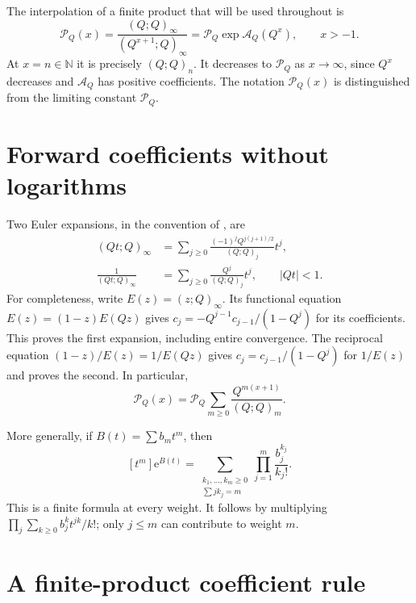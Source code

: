 \documentclass[11pt,openany]{book}
\numberwithin{equation}{chapter}
\theoremstyle{plain}
\theoremstyle{definition}
\theoremstyle{remark}
\newcommand{\ee}{\mathrm e}
\newcommand{\N}{\mathbb N}\newcommand{\R}{\mathbb R}\newcommand{\C}{\mathbb C}\newcommand{\Z}{\mathbb Z}
\newcommand{\coefB}[2]{[#1^{#2}]}             %
\newcommand{\pp}[1]{(Q;Q)_{#1}}
\newcommand{\Pinf}{\mathcal P_Q}
\newcommand{\A}{\mathcal A_Q}
\begin{document}
The interpolation of a finite product that will be used throughout is
\begin{equation}\label{t3:eq:product-interpolation}
 \mathcal P_Q(x)=\frac{(Q;Q)_\infty}{(Q^{x+1};Q)_\infty}
 =\Pinf\exp\A(Q^x),\qquad x>-1.
\end{equation}
At $x=n\in\N$ it is precisely $\pp{n}$. It decreases to $\Pinf$ as $x\to\infty$, since $Q^x$ decreases and $\A$ has positive coefficients. The notation $\mathcal P_Q(x)$ is distinguished from the limiting constant $\Pinf$.

\section{Forward coefficients without logarithms}

Two Euler expansions, in the convention of \cite{dlmfq}, are
\begin{align}
 (Qt;Q)_\infty
 &=\sum_{j\ge0}\frac{(-1)^jQ^{j(j+1)/2}}{\pp{j}}t^j,
 \label{t3:eq:euler-entire}\\
 \frac1{(Qt;Q)_\infty}
 &=\sum_{j\ge0}\frac{Q^j}{\pp{j}}t^j,
 \qquad |Qt|<1.
 \label{t3:eq:euler-recip}
\end{align}
For completeness, write $E(z)=(z;Q)_\infty$. Its functional equation
$E(z)=(1-z)E(Qz)$ gives
$c_j=-Q^{j-1}c_{j-1}/(1-Q^j)$ for its coefficients. This proves the first expansion, including entire convergence. The reciprocal equation
$(1-z)/E(z)=1/E(Qz)$ gives $c_j=c_{j-1}/(1-Q^j)$ for $1/E(z)$ and proves the second. In particular,
\begin{equation}\label{t3:eq:P-forward}
 \mathcal P_Q(x)=\Pinf\sum_{m\ge0}\frac{Q^{m(x+1)}}{\pp{m}}.
\end{equation}

More generally, if $B(t)=\sum b_m t^m$, then
\begin{equation}\label{t3:eq:forward-Bell}
 \coefB{t}{m}\ee^{B(t)}
 =\sum_{\substack{k_1,\ldots,k_m\ge0\\\sum j k_j=m}}
       \prod_{j=1}^m\frac{b_j^{k_j}}{k_j!}.
\end{equation}
This is a finite formula at every weight. It follows by multiplying
$\prod_j\sum_{k\ge0}b_j^k t^{jk}/k!$; only $j\le m$ can contribute to weight $m$.

\section{A finite-product coefficient rule}
\end{document}
